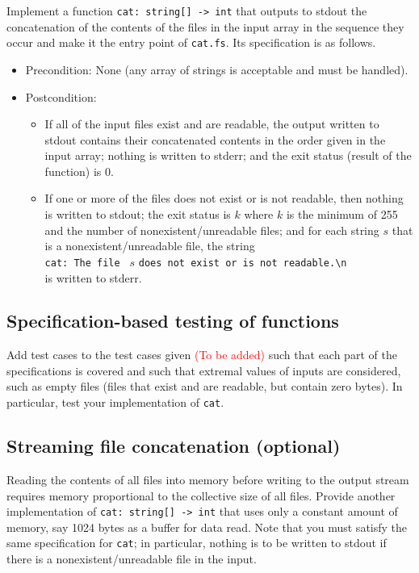 \documentclass[a4paper,11pt]{article}
\newcommand{\comment}[1]{\textcolor{red}{#1}}
\begin{document}
Implement a function \texttt{cat: string[] -> int} that outputs to stdout the concatenation of the contents of the files in the input array in the sequence they occur and make it the entry point of \texttt{cat.fs}. Its specification is as follows.
\begin{itemize}
\item Precondition: None (any array of strings is acceptable and must be handled).
\item Postcondition: 
\begin{itemize}
\item If all of the input files exist and are readable, the output written to stdout contains their concatenated contents in the order given in the input array; nothing is written to stderr; and the exit status (result of the function) is $0$.  
\item If one or more of the files does not exist or is not readable, then
nothing is written to stdout; the exit status is $k$ where $k$ is the minimum of 255 and the number of nonexistent/unreadable files; and for each string $s$ that is a nonexistent/unreadable file, the string \\ \verb|cat: The file | $s$ \verb|does not exist or is not readable.\n| \\ is written to stderr.
\end{itemize}
\end{itemize} 

\subsection{Specification-based testing of functions}

Add test cases to the test cases given \comment{(To be added)} such that each part of the specifications is covered and such that  extremal values of inputs are considered, such as empty files (files that exist and are readable, but contain zero bytes).   In particular, test your implementation of \texttt{cat}.

\subsection{Streaming file concatenation (optional)} 

Reading the contents of all files into memory before writing to the output stream requires memory proportional to the collective size of all files.  Provide another implementation of \texttt{cat: string[] -> int} that uses only a constant amount of memory, say 1024 bytes as a buffer for data read.  Note that you must satisfy the same specification for \texttt{cat}; in particular, nothing is to be written to stdout if there is a nonexistent/unreadable file in the input.
\end{document}
